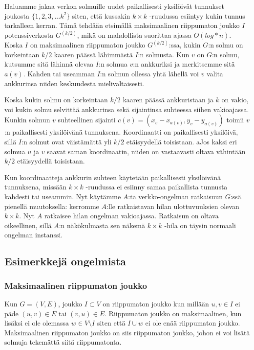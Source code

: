 \documentclass[12pt,finnish]{tktltiki2}
\theoremstyle{definition}
\theoremstyle{remark}
\begin{document}
Haluamme jakaa verkon solmuille uudet paikallisesti yksilöivät tunnukset joukosta $\{1, 2, 3, ... k^2\}$ siten, että kussakin $k \times k$ -ruudussa esiintyy kukin tunnus tarkalleen kerran. Tämä tehdään etsimällä maksimaalinen riippumaton joukko $I$ potenssiverkosta $G^{(k/2)}$, mikä on mahdollista suorittaa ajassa $O(log* n)$. Koska $I$ on maksimaalinen riippumaton joukko $G^{(k/2)}$:ssa, kukin $G$:n solmu on korkeintaan $k/2$ kaaren päässä lähimmästä $I$:n solmusta. Kun $v$ on $G$:n solmu, kutsumme sitä lähinnä olevaa $I$:n solmua $v$:n ankkuriksi ja merkitsemme sitä $a(v)$. Kahden tai useamman $I$:n solmun ollessa yhtä lähellä voi $v$ valita ankkurinsa niiden keskuudesta mielivaltaisesti.

Koska kukin solmu on korkeintaan $k/2$ kaaren päässä ankkuristaan ja $k$ on vakio, voi kukin solmu selvittää ankkurinsa sekä sijaintinsa suhteessa siihen vakioajassa. Kunkin solmun $v$ suhteellinen sijainti $c(v) = (x_v - x_{a(v)}, y_v - y_{a(v)})$ toimii $v$:n paikallisesti yksilöivänä tunnuksena. Koordinaatti on paikallisesti yksilöivä, sillä $I$:n solmut ovat väistämättä yli $k/2$ etäisyydellä toisistaan. aJos kaksi eri solmua $u$ ja $v$ saavat saman koordinaatin, niiden on vastaavasti oltava vähintään $k/2$ etäisyydellä toisistaan.

Kun koordinaatteja ankkurin suhteen käytetään paikallisesti yksilöivänä tunnuksena, missään $k \times k$ -ruudussa ei esiinny samaa paikallista tunnusta kahdesti tai useammin. Nyt käytämme $A$:ta verkko-ongelman ratkaisuun $G$:ssä pienellä muutoksella: kerromme $A$:lle ratkaistavan hilan ulottuvuuksien olevan $k \times k$. Nyt $A$ ratkaisee hilan ongelman vakioajassa. Ratkaisun on oltava oikeellinen, sillä $A$:n näkökulmasta sen näkemä $k \times k$ -hila on täysin normaali ongelman instanssi.

\subsection{Esimerkkejä ongelmista}
\subsubsection{Maksimaalinen riippumaton joukko}
Kun $G = (V, E)$, joukko $I \subset V$ on riippumaton joukko kun millään $u, v \in I$ ei päde $(u, v) \in E$  tai $(v, u) \in E$. Riippumaton joukko on maksimaalinen, kun lisäksi ei ole olemassa $w \in V \setminus I$ siten että $I \cup {w}$ ei ole enää riippumaton joukko. Maksimaalinen riippumaton joukko on siis riippumaton joukko, johon ei voi lisätä solmuja tekemättä siitä riippumatonta.
\end{document}
